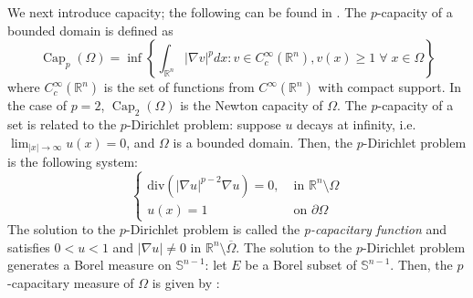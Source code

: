 \documentclass[11pt]{amsart}
\newtheorem{lemma}[theorem]{Lemma}
\theoremstyle{definition}
\theoremstyle{remark}
\numberwithin{equation}{section}
\newcommand{\R}{\mathbb{R}}
\newcommand{\capa}[2]{\operatorname{Cap}_{#1}(#2)}
\newcommand{\s}{\mathbb{S}}
\begin{document}
We next introduce capacity; the following can be found in \cite{EvansGar}. The $p$-capacity of a bounded domain is defined as
\begin{equation}
\capa{p}{\Omega}=\inf \left\{\int_{\R^{n}}|\nabla v|^{p} d x: v \in C_{c}^{\infty}\left(\R^{n}\right), v(x) \geq 1 \; \forall \; x \in \Omega\right\}
 \end{equation}
 where $C_{c}^{\infty}\left(\R^{n}\right)$ is the set of functions from $C^{\infty}\left(\R^{n}\right)$ with compact support. In the case of $p=2$, $\capa{2}{\Omega}$ is the Newton capacity of $\Omega.$
 The $p$-capacity of a set is related to the $p$-Dirichlet problem:
 suppose $u$ decays at infinity, i.e. $\lim_{|x|\to\infty}u(x)=0$, and $\Omega$ is a bounded domain. Then, the $p$-Dirichlet problem is the following system:
 \begin{equation}
 \begin{cases}
     \text{div}(|\nabla u|^{p-2}\nabla u) =0, \; &\text{in }\R^n\setminus\Omega
     \\
     u(x) = 1 \; &\text{on } \partial \Omega
\end{cases}
 \end{equation}
  The solution to the $p$-Dirichlet problem is called the \textit{p-capacitary function} and satisfies $0 < u <1$ and $|\nabla u| \neq 0 $ in $\R^n\setminus \overline{\Omega}.$ 
The solution to the $p$-Dirichlet problem generates a Borel measure on $\s^{n-1}$: let $E$ be a Borel subset of $\s^{n-1}$. Then, the $p$-capacitary measure of $\Omega$ is given by \cite{CJL96, CNSXYZ15, CS03, DJ96_2}:
\end{document}
